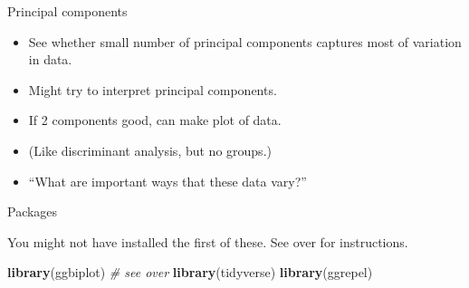 \documentclass[ignorenonframetext,]{beamer}
\newenvironment{Shaded}{\begin{snugshade}}{\end{snugshade}}
\newcommand{\CommentTok}[1]{\textcolor[rgb]{0.56,0.35,0.01}{\textit{#1}}}
\newcommand{\KeywordTok}[1]{\textcolor[rgb]{0.13,0.29,0.53}{\textbf{#1}}}
\newcommand{\NormalTok}[1]{#1}
\begin{document}
\begin{frame}{Principal components}
\protect\hypertarget{principal-components-2}{}

\begin{itemize}
\item
  See whether small number of principal components captures most of
  variation in data.
\item
  Might try to interpret principal components.
\item
  If 2 components good, can make plot of data.
\item
  (Like discriminant analysis, but no groups.)
\item
  ``What are important ways that these data vary?''
\end{itemize}

\end{frame}

\begin{frame}[fragile]{Packages}
\protect\hypertarget{packages-8}{}

You might not have installed the first of these. See over for
instructions.

\begin{Shaded}
\begin{Highlighting}[]
\KeywordTok{library}\NormalTok{(ggbiplot) }\CommentTok{# see over}
\KeywordTok{library}\NormalTok{(tidyverse)}
\KeywordTok{library}\NormalTok{(ggrepel)}
\end{Highlighting}
\end{Shaded}

\end{frame}
\end{document}
